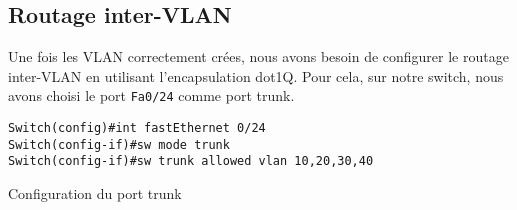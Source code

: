 \documentclass{article}
\begin{document}
\subsection{Routage inter-VLAN}
Une fois les VLAN correctement crées, nous avons besoin de configurer le routage inter-VLAN en utilisant l'encapsulation dot1Q.
Pour cela, sur notre switch, nous avons choisi le port \verb|Fa0/24| comme port trunk.
\begin{listing}[H]
    \begin{verbatim}
Switch(config)#int fastEthernet 0/24
Switch(config-if)#sw mode trunk 
Switch(config-if)#sw trunk allowed vlan 10,20,30,40
    \end{verbatim}
    \caption{Configuration du port trunk}
    \label{reseau:switch:trunk}
\end{listing}
\end{document}
